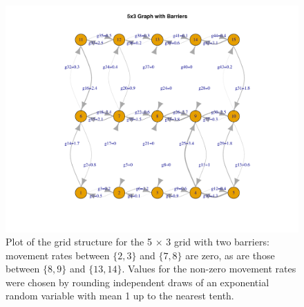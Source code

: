 \documentclass{article}
\begin{document}
\begin{figure}
\centering
     \includegraphics[scale=.6]{figs/5x3b_grid}
    \caption{Plot of the grid structure 
    for the 5 $\times$ 3 grid with two barriers:
    movement rates between $\{2,3\}$ and $\{7,8\}$ are zero,
    as are those between $\{8,9\}$ and $\{13,14\}$.
    Values for the non-zero movement rates 
    were chosen by rounding independent draws of an exponential random variable with mean 1 
    up to the nearest tenth.
    } \label{fig:5x3b_grid}
\end{figure}
\end{document}
